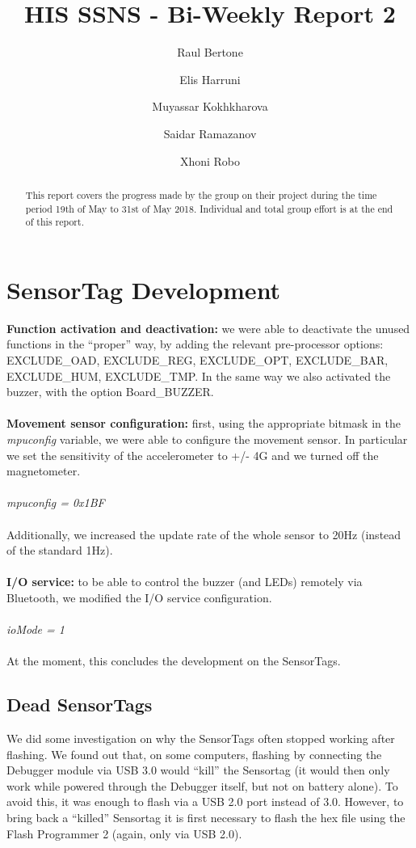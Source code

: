 \documentclass[12pt]{article}
\title{HIS SSNS - Bi-Weekly Report 2}
\author{
	 Raul Bertone
\and Elis Harruni
\and Muyassar Kokhkharova
\and Saidar Ramazanov
\and Xhoni Robo
}
\begin{document}
\maketitle

\begin{abstract}
 This report covers the progress made by the group on their project during the time period 19th of May to 31st of May 2018. Individual and total group effort is at the end of this report.
\end{abstract}

\section{SensorTag Development}
\textbf{Function activation and deactivation:} we were able to deactivate the unused functions in the “proper” way, by adding the relevant pre-processor options: EXCLUDE\_OAD, EXCLUDE\_REG, EXCLUDE\_OPT, EXCLUDE\_BAR, EXCLUDE\_HUM, EXCLUDE\_TMP. In the same way we also activated the buzzer, with the option  Board\_BUZZER.\\\\
\textbf{Movement sensor configuration:} first, using the appropriate bitmask in the \textit{mpuconfig} variable, we were able to configure the movement sensor. In particular we set the sensitivity of the accelerometer to +/- 4G and we turned off the magnetometer.\\\\
\textit{mpuconfig = 0x1BF}\\\\
Additionally, we increased the update rate of the whole sensor to 20Hz (instead of the standard 1Hz).\\\\
\textbf{I/O service:} to be able to control the buzzer (and LEDs) remotely via Bluetooth, we modified the I/O service configuration.\\\\
\textit{ioMode = 1}\\\\
At the moment, this concludes the development on the SensorTags.

\subsection{Dead SensorTags}
We did some investigation on why the SensorTags often stopped working after flashing. We found out that, on some computers, flashing by connecting the Debugger module via USB 3.0 would “kill” the Sensortag (it would then only work while powered through the Debugger itself, but not on battery alone). To avoid this, it was enough to flash via a USB 2.0 port instead of 3.0. However, to bring back a “killed” Sensortag it is first necessary to flash the hex file using the Flash Programmer 2 (again, only via USB 2.0).
\end{document}
